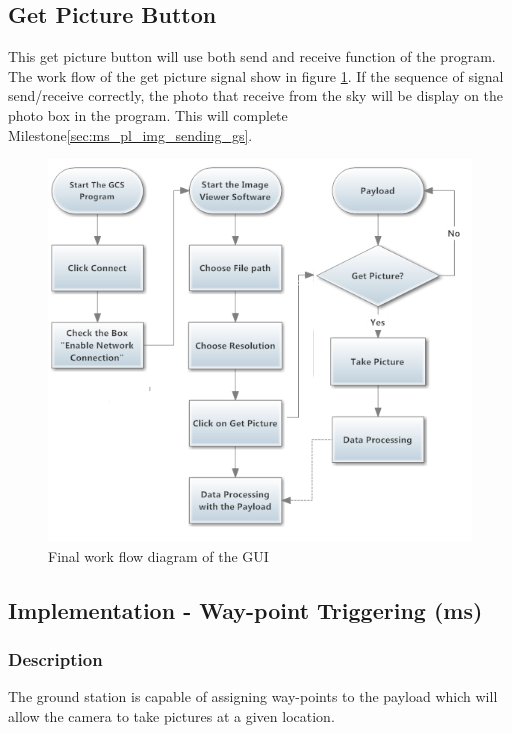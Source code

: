 \subsection{Get Picture Button}
This get picture button will use both send and receive function of the program. 
The work flow of the get picture signal show in figure \ref{GUI_finalWorkFlow}.
If the sequence of signal send/receive correctly, the photo that receive from the sky will be display on the photo box in the program.
This will complete Milestone\ref{sec:ms_pl_img_sending_gs}.

\begin{figure}[H]
\begin{center}
\includegraphics[scale=1]{figures/finalWorkFlow.png} 
\end{center}
\caption{Final work flow diagram of the GUI\label{GUI_finalWorkFlow}}
\end{figure}

\subsection{Implementation - Way-point Triggering (ms)}
\label{sec:waypoint_triggering}

\subsubsection{Description}

The ground station is capable of assigning way-points to
the payload which will allow the camera to take pictures 
at a given location.

